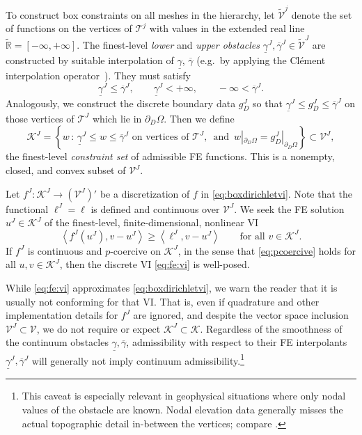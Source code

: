 \documentclass[review,hidelinks,onefignum,onetabnum]{siamart220329}
\newcommand{\RR}{\mathbb{R}}
\newcommand{\cK}{\mathcal{K}}
\newcommand{\ip}[2]{\left<#1,#2\right>}
\begin{document}
To construct box constraints on all meshes in the hierarchy, let $\tilde{\mathcal{V}}^j$ denote the set of functions on the vertices of $\mathcal{T}^j$ with values in the extended real line $\tilde{\RR} = [-\infty,+\infty]$.  The finest-level \emph{lower} and \emph{upper obstacles} $\underline{\gamma}^J, \overline{\gamma}^J \in \tilde{\mathcal{V}}^J$ are constructed by suitable interpolation of $\underline{\gamma}$, $\overline{\gamma}$ (e.g.~by applying the Cl\'ement interpolation operator~\cite{Carstensen2006}).  They must satisfy
\begin{equation}
\underline{\gamma}^J \le \overline{\gamma}^J, \qquad \underline{\gamma}^J < +\infty, \qquad -\infty < \overline{\gamma}^J. \label{eq:fe:boxconstraintrequirements}
\end{equation}
Analogously, we construct the discrete boundary data $g_D^J$ so that $\underline{\gamma}^J \le g_D^J \le \overline{\gamma}^J$ on those vertices of $\mathcal{T}^J$ which lie in $\partial_D \Omega$.  Then we define
\begin{equation}
\mathcal{K}^J = \left\{w\,:\,\underline{\gamma}^J \le w \le \overline{\gamma}^J \text{ on vertices of } \mathcal{T}^J, \, \text{ and } \, w|_{\partial_D\Omega} = g_D^J|_{\partial_D\Omega}\right\} \subset \mathcal{V}^J, \label{eq:fe:fineconstraintset}
\end{equation}
the finest-level \emph{constraint set} of admissible FE functions. This is a nonempty, closed, and convex subset of $\mathcal{V}^J$.

Let $f^J:\mathcal{K}^J \to (\mathcal{V}^J)'$ be a discretization of $f$ in \eqref{eq:boxdirichletvi}.  Note that the functional $\ell^J=\ell$ is defined and continuous over $\mathcal{V}^J$.  We seek the FE solution $u^J \in \mathcal{K}^J$ of the finest-level, finite-dimensional, nonlinear VI
\begin{equation}
\ip{f^J(u^J)}{v-u^J} \ge \ip{\ell^J}{v-u^J} \qquad \text{for all } v\in \cK^J. \label{eq:fe:vi}
\end{equation}
If $f^J$ is continuous and $p$-coercive on $\mathcal{K}^J$, in the sense that \eqref{eq:pcoercive} holds for all $u,v \in \mathcal{K}^J$, then the discrete VI \eqref{eq:fe:vi} is well-posed.

While \eqref{eq:fe:vi} approximates \eqref{eq:boxdirichletvi}, we warn the reader that it is usually not conforming for that VI.  That is, even if quadrature and other implementation details for $f^J$ are ignored, and despite the vector space inclusion $\mathcal{V}^J \subset \mathcal{V}$, we do not require or expect $\mathcal{K}^J \subset \mathcal{K}$.  Regardless of the smoothness of the continuum obstacles $\underline{\gamma}, \overline{\gamma}$, admissibility with respect to their FE interpolants $\underline{\gamma}^J, \overline{\gamma}^J$ will generally not imply continuum admissibility.\footnote{This caveat is especially relevant in geophysical situations where only nodal values of the obstacle are known.  Nodal elevation data generally misses the actual topographic detail in-between the vertices; compare \cite{Bueler2016}.}
\end{document}
